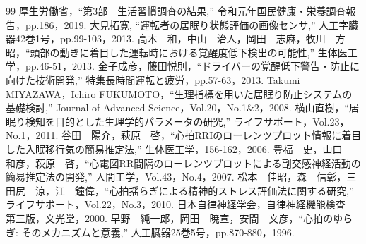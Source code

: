 \begin{thebibliography}{99}
\bibitem{[1]} 厚生労働省，``第3部　生活習慣調査の結果,'' 令和元年国民健康・栄養調査報告，pp.186，2019.
\bibitem{[2]} 大見拓寛, ``運転者の居眠り状態評価の画像センサ,'' 人工字臓器42巻1号，pp.99-103，2013.
\bibitem{[3]} 高木　和，中山　治人，岡田　志麻，牧川　方昭，``頭部の動きに着目した運転時における覚醒度低下検出の可能性,'' 生体医工学，pp.46-51，2013.
\bibitem{[4]} 金子成彦，藤田悦則，``ドライバーの覚醒低下警告・防止に向けた技術開発,'' 特集長時間運転と疲労，pp.57-63，2013.
\bibitem{[5]} Takumi MIYAZAWA，Ichiro FUKUMOTO，``生理指標を用いた居眠り防止システムの基礎検討,'' Journal of Advanced Science，Vol.20，No.1$\&$2，2008.
\bibitem{[6]} 横山直樹，``居眠り検知を目的とした生理学的パラメータの研究,'' ライフサポート，Vol.23，No.1，2011.
\bibitem{[7]} 谷田　陽介，萩原　啓，``心拍RRIのローレンツプロット情報に着目した入眠移行気の簡易推定法,'' 生体医工学，156-162，2006.
\bibitem{[8]} 豊福　史，山口　和彦，萩原　啓，``心電図RR間隔のローレンツプロットによる副交感神経活動の簡易推定法の開発,'' 人間工学，Vol.43，No.4，2007.
\bibitem{[9]} 松本　佳昭，森　信彰，三田尻　涼，江　鐘偉，``心拍揺らぎによる精神的ストレス評価法に関する研究,'' ライフサポート，Vol.22，No.3，2010.
\bibitem{[10]} 日本自律神経学会，自律神経機能検査　第三版，文光堂，2000.
\bibitem{[11]} 早野　純一郎，岡田　暁宣，安間　文彦，``心拍のゆらぎ: そのメカニズムと意義,'' 人工臓器25巻5号，pp.870-880，1996.
\end{thebibliography}